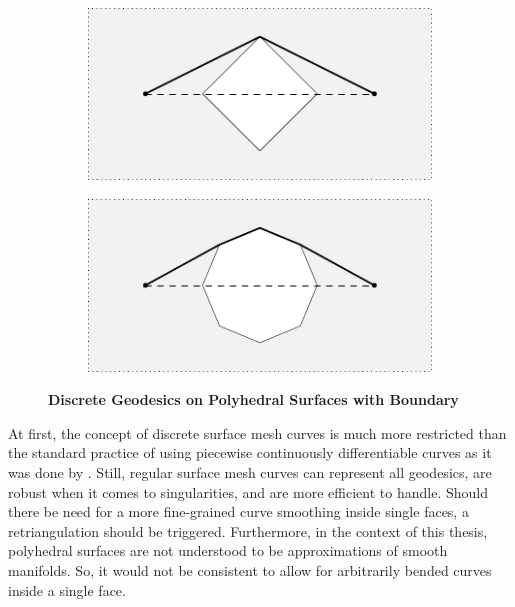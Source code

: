\documentclass{stdlocal}
\begin{document}
  \begin{figure}[t]
    \centering
    \begin{subfigure}[b]{0.49\linewidth}
      \centering
      \includegraphics[width=\linewidth]{figures/geodesic-on-boundary-discrete-1.pdf}
    \end{subfigure}
    \hfill
    \begin{subfigure}[b]{0.49\linewidth}
      \centering
      \includegraphics[width=\linewidth]{figures/geodesic-on-boundary-discrete-2.pdf}
    \end{subfigure}
    \caption[Discrete Geodesics on Polyhedral Surfaces with Boundary]{%
      \textbf{Discrete Geodesics on Polyhedral Surfaces with Boundary}\\
    }
    \label{fig:discrete-geodesics-on-boundary}
  \end{figure}

  At first, the concept of discrete surface mesh curves is much more restricted than the standard practice of using piecewise continuously differentiable curves as it was done by \textcite{polthier2006}.
  Still, regular surface mesh curves can represent all geodesics, are robust when it comes to singularities, and are more efficient to handle.
  Should there be need for a more fine-grained curve smoothing inside single faces, a retriangulation should be triggered.
  Furthermore, in the context of this thesis, polyhedral surfaces are not understood to be approximations of smooth manifolds.
  So, it would not be consistent to allow for arbitrarily bended curves inside a single face.
\end{document}
